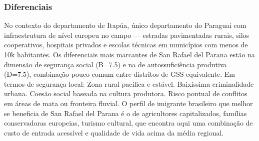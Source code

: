 \subsubsection*{Diferenciais}\label{dif-san-rafael-del-parana-0721}
No contexto do departamento de Itapúa, único departamento do Paraguai com infraestrutura de nível europeu no campo — estradas pavimentadas rurais, silos cooperativos, hospitais privados e escolas técnicas em municípios com menos de 10k habitantes. Os diferenciais mais marcantes de San Rafael del Parana estão na dimensão de segurança social (B=7.5) e na de autossuficiência produtiva (D=7.5), combinação pouco comum entre distritos de GSS equivalente. Em termos de segurança local: Zona rural pacífica e estável. Baixíssima criminalidade urbana. Coesão social baseada na cultura produtora. Risco pontual de conflitos em áreas de mata ou fronteira fluvial. O perfil de imigrante brasileiro que melhor se beneficia de San Rafael del Parana é o de agricultores capitalizados, famílias conservadoras europeias, turismo cultural, que encontra aqui uma combinação de custo de entrada acessível e qualidade de vida acima da média regional.
